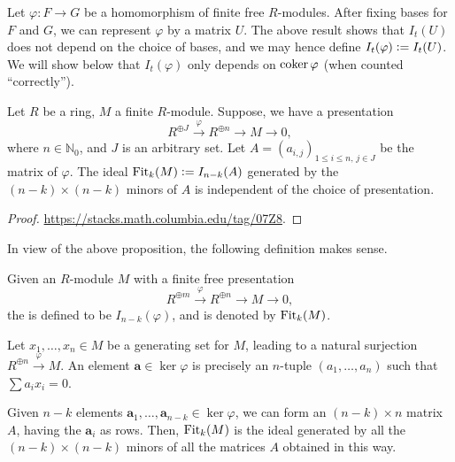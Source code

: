 \documentclass[12pt]{article}
\begin{document}
Let $\varphi : F \to G$ be a homomorphism of finite free $R$-modules. After fixing bases for $F$ and $G$, we can represent $\varphi$ by a matrix $U$. The above result shows that $I_{t}(U)$ does not depend on the choice of bases, and we may hence define $I_{t}(\varphi) \vcentcolon= I_{t}(U)$. We will show below that $I_{t}(\varphi)$ only depends on $\operatorname{coker} \varphi$ (when counted ``correctly'').

\begin{prop}
	Let $R$ be a ring, $M$ a finite $R$-module. Suppose, we have a presentation
	\begin{equation*} 
		R^{\oplus J} \xrightarrow{\varphi} R^{\oplus n} \to M \to 0,
	\end{equation*}
	where $n \in \mathbb{N}_{0}$, and $J$ is an arbitrary set. \newline
	Let $A = (a_{i, j})_{1 \le i \le n,\, j \in J}$ be the matrix of $\varphi$. The ideal $\operatorname{Fit}_{k}(M) \vcentcolon= I_{n - k}(A)$ generated by the $(n - k) \times (n - k)$ minors of $A$ is independent of the choice of presentation. 
\end{prop}
\begin{proof} 
	\url{https://stacks.math.columbia.edu/tag/07Z8}.
\end{proof}

In view of the above proposition, the following definition makes sense.
\begin{defn}
	Given an $R$-module $M$ with a finite free presentation
	\begin{equation*} 
		R^{\oplus m} \xrightarrow{\varphi} R^{\oplus n} \to M \to 0,
	\end{equation*}
	the  is defined to be $I_{n - k}(\varphi)$, and is denoted by $\operatorname{Fit}_{k}(M)$.
\end{defn}

\begin{rem}
	Let $x_{1}, \ldots, x_{n} \in M$ be a generating set for $M$, leading to a natural surjection $R^{\oplus n} \xrightarrow{\varphi} M$. An element $\mathbf{a} \in \ker \varphi$ is precisely an $n$-tuple $(a_{1}, \ldots, a_{n})$ such that $\sum a_{i} x_{i} = 0$. 

	Given $n - k$ elements $\mathbf{a}_{1}, \ldots, \mathbf{a}_{n - k} \in \ker \varphi$, we can form an $(n - k) \times n$ matrix $A$, having the $\mathbf{a}_{i}$ as rows. Then, $\operatorname{Fit}_{k}(M)$ is the ideal generated by all the $(n - k) \times (n - k)$ minors of all the matrices $A$ obtained in this way.
\end{rem}
\end{document}
